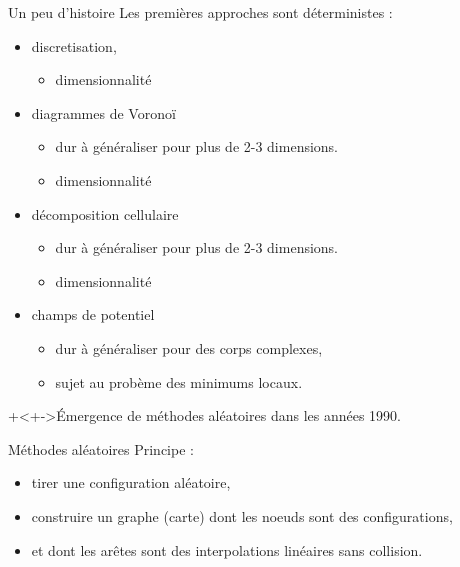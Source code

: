 
%
%

\begin{frame}[<+->]{Un peu d'histoire}
  Les premi\`eres approches sont d\'eterministes :
  \begin{itemize}
    \item discretisation,
      \begin{itemize}
        \item dimensionnalit\'e
      \end{itemize}
    \item diagrammes de Vorono\"i
      \begin{itemize}
        \item dur \`a g\'en\'eraliser pour plus de 2-3 dimensions.
        \item dimensionnalit\'e
      \end{itemize}
    \item décomposition cellulaire
      \begin{itemize}
        \item dur \`a g\'en\'eraliser pour plus de 2-3 dimensions.
        \item dimensionnalit\'e
      \end{itemize}
    \item champs de potentiel
      \begin{itemize}
        \item dur \`a g\'en\'eraliser pour des corps complexes,
        \item sujet au prob\`eme des minimums locaux.
      \end{itemize}
  \end{itemize}
  \onslide+<+->{\'Emergence de m\'ethodes al\'eatoires dans les ann\'ees 1990.}
\end{frame}

%
%

\begin{frame} {M\'ethodes al\'eatoires}
  Principe :
  \begin{itemize}
    \item tirer une configuration al\'eatoire,
      \pause
    \item construire un graphe (carte) dont les noeuds sont des configurations,
      \pause
    \item et dont les ar\^etes sont des interpolations lin\'eaires sans collision.
  \end{itemize}
\end{frame}

